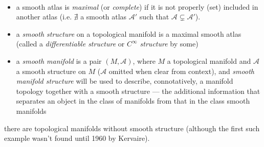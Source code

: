 
\begin{defn}\
  \begin{itemize}
  \item
    a smooth atlas is \emph{maximal} (or \emph{complete})
    if it is not properly (set) included in another atlas
    (i.e. $\nexists$ a smooth atlas $\mathscr A'$
    such that $\mathscr A\subsetneq \mathscr A'$).
  \item
    a \emph{smooth structure} on a topological manifold
    is a maximal smooth atlas (called a \emph{differentiable structure}
    or \emph{$C^\infty$ structure} by some)
  \item
    a \emph{smooth manifold} is a pair $(M, \mathscr A)$,
    where $M$ a topological manifold and $\mathscr A$
    a smooth structure on $M$
    ($\mathscr A$ omitted when clear from context), and
    \emph{smooth manifold structure} will be used to describe,
    connotatively, a manifold topology together with a smooth structure
    --- the additional information that separates an object in the
    class of manifolds from that in the class smooth manifolds
  \end{itemize}
\end{defn}

\begin{rem}{}
  there are topological manifolds without smooth structure
  (although the first such example wasn't found until
  1960 by Kervaire).
\end{rem}

